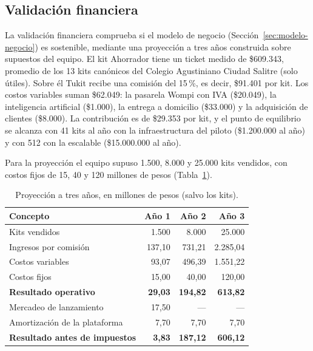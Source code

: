 


\subsection{Validación financiera}
\label{sec:viabilidad}

La validación financiera comprueba si el modelo de negocio (Sección~\ref{sec:modelo-negocio}) es sostenible,
mediante una proyección a tres años construida sobre supuestos del equipo. El kit Ahorrador tiene un ticket
medido de \$609.343, promedio de los 13 kits canónicos del Colegio Agustiniano Ciudad Salitre (solo útiles).
Sobre él Tukit recibe una comisión del 15\,\%, es decir, \$91.401 por kit. Los costos variables suman \$62.049:
la pasarela Wompi con IVA (\$20.049), la inteligencia artificial (\$1.000), la entrega a domicilio (\$33.000)
y la adquisición de clientes (\$8.000). La contribución es de \$29.353 por kit, y el punto de equilibrio se
alcanza con 41 kits al año con la infraestructura del piloto (\$1.200.000 al año) y con 512 con la escalable
(\$15.000.000 al año).

Para la proyección el equipo supuso 1.500, 8.000 y 25.000 kits vendidos, con costos fijos de 15, 40 y 120
millones de pesos (Tabla~\ref{tab:proyeccion}).

\begin{table}[!htb]
\centering\small
\caption{Proyección a tres años, en millones de pesos (salvo los kits).}
\label{tab:proyeccion}
\begin{tabular}{@{}lrrr@{}}
\toprule
\textbf{Concepto} & \textbf{Año 1} & \textbf{Año 2} & \textbf{Año 3} \\
\midrule
Kits vendidos & 1.500 & 8.000 & 25.000 \\
Ingresos por comisión & 137,10 & 731,21 & 2.285,04 \\
Costos variables & 93,07 & 496,39 & 1.551,22 \\
Costos fijos & 15,00 & 40,00 & 120,00 \\
\textbf{Resultado operativo} & \textbf{29,03} & \textbf{194,82} & \textbf{613,82} \\
\addlinespace
Mercadeo de lanzamiento & 17,50 & --- & --- \\
Amortización de la plataforma & 7,70 & 7,70 & 7,70 \\
\textbf{Resultado antes de impuestos} & \textbf{3,83} & \textbf{187,12} & \textbf{606,12} \\
\bottomrule
\end{tabular}
\end{table}

